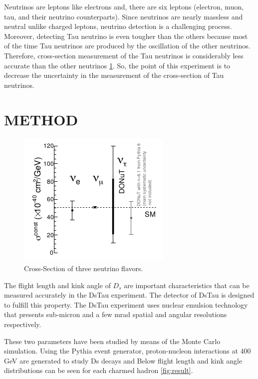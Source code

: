 \documentclass[12pt]{report}
\begin{document}
Neutrinos are leptons like electrons and, there are six leptons (electron, muon, tau, and their neutrino counterparts). Since neutrinos are nearly massless and neutral unlike charged leptons, neutrino detection is a challenging process. Moreover, detecting Tau neutrino is even tougher than the others because most of the time Tau neutrinos are produced by the oscillation of the other neutrinos. Therefore, cross-section measurement of the Tau neutrinos is considerably less accurate than the other neutrinos \ref{fig:cross}. So, the point of this experiment is to decrease the uncertainty in the measurement of the cross-section of Tau neutrinos.

\newpage

\section{METHOD}


\begin{figure}[htp]
\centering
\includegraphics[width = 6 cm]{LeptonCross.png}
\caption{Cross-Section of three neutrino flavors.~\cite[p.~2]{aoki_ariga_dmitrievsky_firu_forshaw_fukuda_gornushkin_guler_haiduc_2019}}
\label{fig:cross}
\end{figure}

The flight length and kink angle of $D_s$ are important characteristics that can be measured accurately in the DsTau experiment. The detector of DsTau is designed to fulfill this property. The DsTau experiment uses nuclear emulsion technology that presents sub-micron and a few mrad spatial and angular resolutions respectively.

These two parameters have been studied by means of the Monte Carlo simulation. Using the Pythia event generator, proton-nucleon interactions at 400 GeV are generated to study Ds decays and Below flight length and kink angle distributions can be seen for each charmed hadron \ref{fig:result}.
\end{document}
